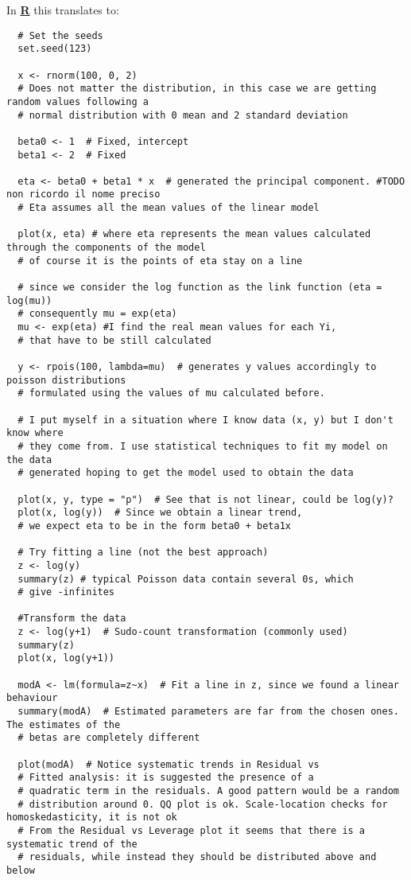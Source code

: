 In \underline{\textbf{R}} this translates to:
\begin{verbatim}
  # Set the seeds 
  set.seed(123)  
  
  x <- rnorm(100, 0, 2)  
  # Does not matter the distribution, in this case we are getting random values following a
  # normal distribution with 0 mean and 2 standard deviation 
  
  beta0 <- 1  # Fixed, intercept
  beta1 <- 2  # Fixed 
  
  eta <- beta0 + beta1 * x  # generated the principal component. #TODO non ricordo il nome preciso
  # Eta assumes all the mean values of the linear model
  
  plot(x, eta) # where eta represents the mean values calculated through the components of the model
  # of course it is the points of eta stay on a line
  
  # since we consider the log function as the link function (eta = log(mu))
  # consequently mu = exp(eta)
  mu <- exp(eta) #I find the real mean values for each Yi,
  # that have to be still calculated
  
  y <- rpois(100, lambda=mu)  # generates y values accordingly to poisson distributions 
  # formulated using the values of mu calculated before. 
  
  # I put myself in a situation where I know data (x, y) but I don't know where
  # they come from. I use statistical techniques to fit my model on the data
  # generated hoping to get the model used to obtain the data
  
  plot(x, y, type = "p")  # See that is not linear, could be log(y)? 
  plot(x, log(y))  # Since we obtain a linear trend, 
  # we expect eta to be in the form beta0 + beta1x
  
  # Try fitting a line (not the best approach) 
  z <- log(y)  
  summary(z) # typical Poisson data contain several 0s, which
  # give -infinites 
  
  #Transform the data
  z <- log(y+1)  # Sudo-count transformation (commonly used) 
  summary(z)
  plot(x, log(y+1))
  
  modA <- lm(formula=z~x)  # Fit a line in z, since we found a linear behaviour
  summary(modA)  # Estimated parameters are far from the chosen ones. The estimates of the
  # betas are completely different
  
  plot(modA)  # Notice systematic trends in Residual vs 
  # Fitted analysis: it is suggested the presence of a 
  # quadratic term in the residuals. A good pattern would be a random 
  # distribution around 0. QQ plot is ok. Scale-location checks for homoskedasticity, it is not ok 
  # From the Residual vs Leverage plot it seems that there is a systematic trend of the 
  # residuals, while instead they should be distributed above and below 
  

\end{verbatim}
